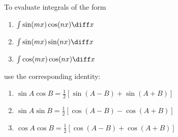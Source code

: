 \begin{frame}
To evaluate integrals of the form
\begin{enumerate}
\item  $\int \sin (mx) \cos (nx) \diff x$
\item  $\int \sin (mx) \sin (nx) \diff x$
\item  $\int \cos (mx) \cos (nx) \diff x$
\end{enumerate}
use the corresponding identity:
\begin{enumerate}
\item  $\sin A \cos B = \frac{1}{2}[\sin (A-B) + \sin (A+B)]$
\item  $\sin A \sin B = \frac{1}{2}[\cos (A-B) - \cos (A+B)]$
\item  $\cos A \cos B = \frac{1}{2}[\cos (A-B) + \cos (A+B)]$
\end{enumerate}
\end{frame}
